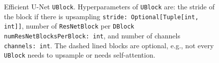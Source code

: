 \begin{figure}
\caption{Efficient U-Net \texttt{UBlock}. Hyperparameters of \texttt{UBlock} are: the stride of the block if there is upsampling \texttt{stride:~Optional[Tuple[int, int]]}, number of \texttt{ResNetBlock} per \texttt{DBlock} \texttt{numResNetBlocksPerBlock:~int}, and number of channels \texttt{channels:~int}. The dashed lined blocks are optional, e.g., not every \texttt{UBlock} needs to upsample or needs self-attention.}
\label{fig:efficient_unet_ublock}
\end{figure}





